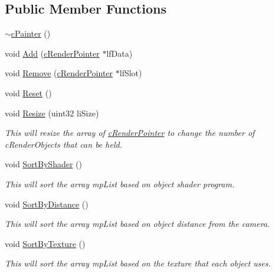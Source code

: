 \subsection*{Public Member Functions}
\begin{DoxyCompactItemize}
\item 
\hyperlink{classc_painter_ac5f4532029629872f3a7285f426fd14b}{$\sim$cPainter} ()
\item 
void \hyperlink{classc_painter_a77807cb6f4b05d7425a162a2d69dfd2e}{Add} (\hyperlink{classc_render_pointer}{cRenderPointer} $\ast$lfData)
\item 
void \hyperlink{classc_painter_adcf40f909775cd15c58ed34968ce8f3c}{Remove} (\hyperlink{classc_render_pointer}{cRenderPointer} $\ast$lfSlot)
\item 
void \hyperlink{classc_painter_a0dd641a9ab21cade6d1c339fe498dbb5}{Reset} ()
\item 
void \hyperlink{classc_painter_a0f2252892148f0e76a9c95cf6258de85}{Resize} (uint32 liSize)
\begin{DoxyCompactList}\small\item\em This will resize the array of \hyperlink{classc_render_pointer}{cRenderPointer} to change the number of cRenderObjects that can be held. \item\end{DoxyCompactList}\item 
void \hyperlink{classc_painter_aa8cf6053e8a310fc843e5e9cd7c95173}{SortByShader} ()
\begin{DoxyCompactList}\small\item\em This will sort the array mpList based on object shader program. \item\end{DoxyCompactList}\item 
void \hyperlink{classc_painter_a65b3e6e9472009ef951261d1641f3773}{SortByDistance} ()
\begin{DoxyCompactList}\small\item\em This will sort the array mpList based on object distance from the camera. \item\end{DoxyCompactList}\item 
void \hyperlink{classc_painter_a06f0d0777d5578793ea5cb07aa8b10cc}{SortByTexture} ()
\begin{DoxyCompactList}\small\item\em This will sort the array mpList based on the texture that each object uses. \item\end{DoxyCompactList}\item 

\end{DoxyCompactItemize}
